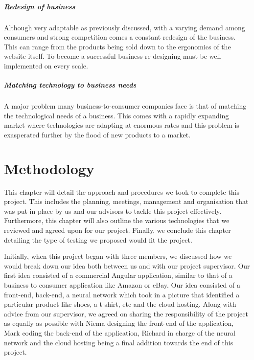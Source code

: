 \paragraph{Redesign of business}Although very adaptable as previously discussed, with a varying demand among consumers and strong competition comes a constant redesign of the business. This can range from the products being sold down to the ergonomics of the website itself. To become a successful business re-designing must be well implemented on every scale.

\paragraph{Matching technology to business needs}A major problem many business-to-consumer companies face is that of matching the technological needs of a business. This comes with a rapidly expanding market where technologies are adapting at enormous rates and this problem is exasperated further by the flood of new products to a market. 

\chapter{Methodology}
This chapter will detail the approach and procedures we took to complete this project. This includes the planning, meetings, management and organisation that was put in place by us and our advisors to tackle this project effectively. Furthermore, this chapter will also outline the various technologies that we reviewed and agreed upon for our project. Finally, we conclude this chapter detailing the type of testing we proposed would fit the project.

Initially, when this project began with three members, we discussed how we would break down our idea both between us and with our project supervisor. Our first idea consisted of a commercial Angular application, similar to that of a business to consumer application like Amazon or eBay. Our idea consisted of a front-end, back-end, a neural network which took in a picture that identified a particular product like shoes, a t-shirt, etc and the cloud hosting. Along with advice from our supervisor,  we agreed on sharing the responsibility of the project as equally as possible with Niema designing the front-end of the application, Mark coding the back-end of the application, Richard in charge of the neural network and the cloud hosting being a final addition towards the end of this project.

